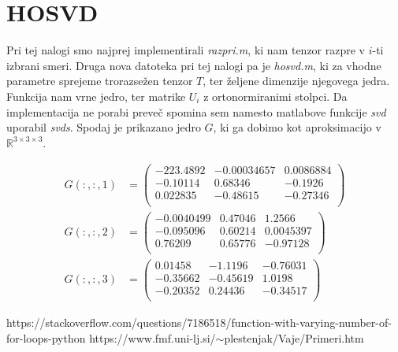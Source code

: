 \documentclass[a4paper,12pt]{article}
\def\R{\mathbb{R}} %
\begin{document}
\section{HOSVD}
Pri tej nalogi smo najprej implementirali \emph{razpri.m}, ki nam tenzor razpre v $i$-ti izbrani smeri.  Druga nova datoteka pri tej nalogi pa je \emph{hosvd.m}, ki za vhodne parametre sprejeme trorazsežen tenzor $T$, ter željene dimenzije njegovega jedra. Funkcija nam vrne jedro, ter matrike $U_i$ z ortonormiranimi stolpci. Da implementacija ne porabi preveč spomina sem namesto matlabove funkcije \emph{svd} uporabil \emph{svds}. Spodaj je prikazano jedro $G$, ki ga dobimo kot aproksimacijo v $\R^{3 \times 3 \times 3}$. 

\begin{align*}
G(:, :, 1) &= 
\begin{pmatrix}
-223.4892&-0.00034657&0.0086884\\
-0.10114&0.68346&-0.1926\\
0.022835&-0.48615&-0.27346\\
\end{pmatrix}\\
G(:, :, 2) &= 
\begin{pmatrix}
-0.0040499&0.47046&1.2566\\
-0.095096&0.60214&0.0045397\\
0.76209&0.65776&-0.97128\\
\end{pmatrix}\\
G(:, :, 3) &= 
\begin{pmatrix}
0.01458&-1.1196&-0.76031\\
-0.35662&-0.45619&1.0198\\
-0.20352&0.24436&-0.34517\\
\end{pmatrix}
\end{align*}



\begin{thebibliography}{1}
	https://stackoverflow.com/questions/7186518/function-with-varying-number-of-for-loops-python
	https://www.fmf.uni-lj.si/$\sim$plestenjak/Vaje/Primeri.htm
\end{thebibliography}
\end{document}
